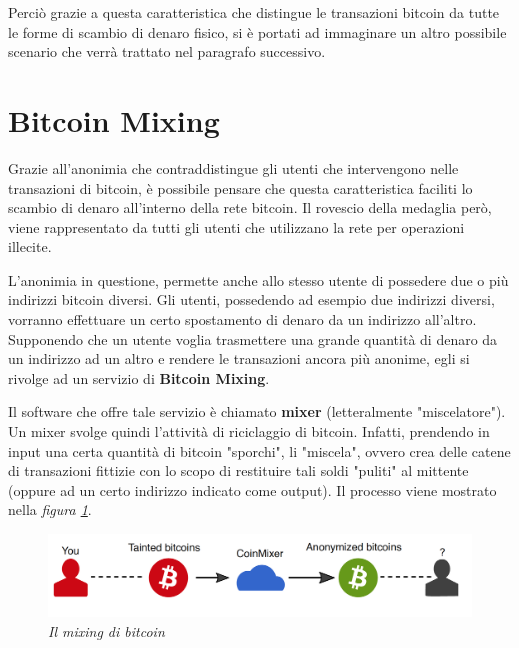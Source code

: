 Perciò grazie a questa caratteristica che distingue le transazioni bitcoin da tutte le forme di scambio di denaro fisico, si è portati ad immaginare un altro possibile scenario che verrà trattato nel paragrafo successivo.

\section{Bitcoin Mixing}

Grazie all'anonimia che contraddistingue gli utenti che intervengono nelle transazioni di bitcoin, è possibile pensare che questa caratteristica faciliti lo scambio di denaro all'interno della rete bitcoin. Il rovescio della medaglia però, viene rappresentato da tutti gli utenti che utilizzano la rete per operazioni illecite.

L'anonimia in questione, permette anche allo stesso utente di possedere due o più indirizzi bitcoin diversi. Gli utenti, possedendo ad esempio due indirizzi diversi, vorranno effettuare un certo spostamento di denaro da un indirizzo all'altro. Supponendo che un utente voglia trasmettere una grande quantità di denaro da un indirizzo ad un altro e rendere le transazioni ancora più anonime, egli si rivolge ad un servizio di \textbf{Bitcoin Mixing}.

Il software che offre tale servizio è chiamato \textbf{mixer} (letteralmente "miscelatore"). Un mixer svolge quindi l'attività di riciclaggio di bitcoin. Infatti, prendendo in input una certa quantità di bitcoin "sporchi", li "miscela", ovvero crea delle catene di transazioni fittizie con lo scopo di restituire tali soldi "puliti" al mittente (oppure ad un certo indirizzo indicato come output). Il processo viene mostrato nella \textit{figura \ref{fig:mixingschema}}.

\begin{figure}[htbp]
	\centering
	\includegraphics[width = \linewidth]{figure/mixingschema}
	\caption{\textit{Il mixing di bitcoin }\cite{coinmixer}}\label{fig:mixingschema}
\end{figure}

